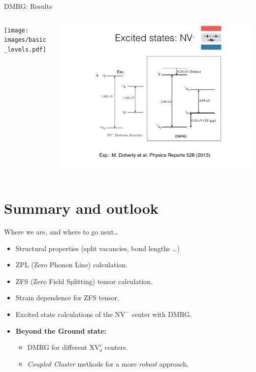 \documentclass[notes=hide]{beamer}
\begin{document}
\begin{frame}{DMRG: Results}
  \begin{columns}
    \begin{column}{0.5\textwidth}
      \texttt{[image: images/basic\_levels.pdf]}
    \end{column}
    \begin{column}{0.5\textwidth}
      \includegraphics[width=1\textwidth, trim=500 200 190 200, clip]{images/dmrg_results.pdf}
    \end{column}
  \end{columns}
\end{frame}



\section{Summary and outlook} %




\begin{frame}{Where we are, and where to go next\ldots}
  \begin{itemize}
    \item Structural properties (split vacancies, bond lengths \ldots )
    \item ZPL (Zero Phonon Line) calculation.
    \item ZFS (Zero Field Splitting) tensor calculation.
    \item Strain dependence for ZFS tensor.
    \item Excited state calculations of the $ \mathrm{NV}^{-} $ center with DMRG.
    \item \textbf{Beyond the Ground state:}\\
      \begin{itemize}
        \item DMRG for different $ \mathrm{XV}^{c}_{a} $ centers.
        \item \textit{Coupled Cluster} methods for a more \textit{robust} approach.
      \end{itemize}
  \end{itemize}
\end{frame}



\end{document}
